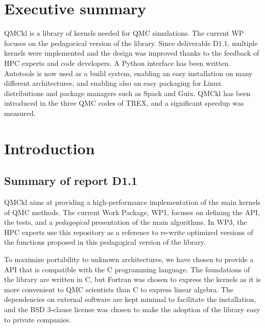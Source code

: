 \newcommand{\orgmode}{\texttt{org-mode}}
\newcommand{\Makefile}{\texttt{Makefile}}
\newcommand{\context}{\texttt{context}}
\newcommand{\CC}{C\nolinebreak\hspace{-.05em}\raisebox{.4ex}{\tiny\bf +}\nolinebreak\hspace{-.10em}\raisebox{.4ex}{\tiny\bf +}}
\def\CC{{C\nolinebreak[4]\hspace{-.05em}\raisebox{.4ex}{\tiny\bf ++}}}

\section{Executive summary}

QMCkl is a library of kernels needed for \ac{QMC} simulations. The current \ac{WP}
focuses on the pedagocical version of the library. Since deliverable D1.1, multiple kernels 
were implemented and the design was improved thanks to the feedback of HPC experts and code
developers. A Python interface has been written. Autotools is now used as a build system, 
enabling an easy installation on many different architectures, and enabling also an easy
packaging for Linux distributions and package managers such as Spack and Guix.
QMCkl has been introduced in the three \ac{QMC} codes of TREX, and a significant speedup
was measured.


\section{Introduction}

\subsection{Summary of report D1.1}

\Ac{QMCkl} aims at providing a high-performance
implementation of the main kernels of \ac{QMC} methods. 
The current Work Package, WP1, focuses on defining the \ac{API}, the tests,
and a \emph{pedagogical} presentation of the main algorithms.
In WP3, the \ac{HPC} experts use this repository as a reference to re-write
optimized versions of the functions proposed in this pedagogical version of the library.

To maximize portability to unknown architectures, we have chosen to provide a \ac{API} that
is compatible with the C programming language. The foundations of the library are written in C, but Fortran
was chosen to express the kernels as it is more convenient to \ac{QMC} scientists than C to express linear algebra.
The dependencies on external software are kept minimal to facilitate the installation, and the
BSD 3-clause license was chosen to make the adoption of the library easy to private companies. 

